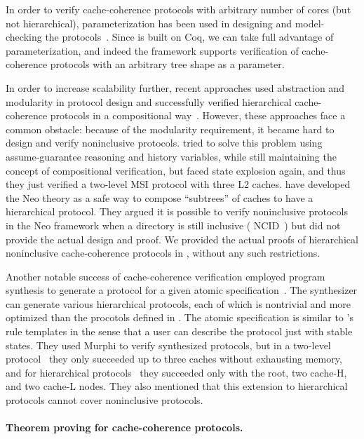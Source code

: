 \documentclass[sigplan,10pt,review,anonymous,screen]{acmart}\settopmatter{printfolios=true,printccs=false,printacmref=false}
\begin{document}
In order to verify cache-coherence protocols with arbitrary number of cores (but not hierarchical), parameterization has been used in designing and model-checking the protocols~\cite{Zhang:2010,Zhang:2014,Banks:2017}.
Since \hemiola{} is built on Coq, we can take full advantage of parameterization, and indeed the framework supports verification of cache-coherence protocols with an arbitrary tree shape as a parameter.

In order to increase scalability further, recent approaches used abstraction and modularity in protocol design and successfully verified hierarchical cache-coherence protocols in a compositional way~\cite{Chen:2008,Chen:2010,Opeoluwa:2016,Opeoluwa:2017}.
However, these approaches face a common obstacle: because of the modularity requirement, it became hard to design and verify noninclusive protocols.
\cite{Chen:2008,Chen:2010} tried to solve this problem using assume-guarantee reasoning and history variables, while still maintaining the concept of compositional verification, but faced state explosion again, and thus they just verified a two-level MSI protocol with three L2 caches.
\cite{Opeoluwa:2016,Opeoluwa:2017} have developed the Neo theory as a safe way to compose ``subtrees'' of caches to have a hierarchical protocol.
They argued it is possible to verify noninclusive protocols in the Neo framework when a directory is still inclusive (\eg{} NCID~\cite{Zhao:2010}) but did not provide the actual design and proof.
We provided the actual proofs of hierarchical noninclusive cache-coherence protocols in \hemiola{}, without any such restrictions.

Another notable success of cache-coherence verification employed program synthesis to generate a protocol for a given atomic specification~\cite{Oswald:2018,Oswald:2020}.
The synthesizer can generate various hierarchical protocols, each of which is nontrivial and more optimized than the procotols defined in \hemiola{}.
The atomic specification is similar to \hemiola{}'s rule templates in the sense that a user can describe the protocol just with stable states.
They used Murphi to verify synthesized protocols, but in a two-level protocol~\cite{Oswald:2018} they only succeeded up to three caches without exhausting memory, and for hierarchical protocols~\cite{Oswald:2020} they succeeded only with the root, two cache-H, and two cache-L nodes.
They also mentioned that this extension to hierarchical protocols cannot cover noninclusive protocols.

\paragraph{Theorem proving for cache-coherence protocols.}
\end{document}
